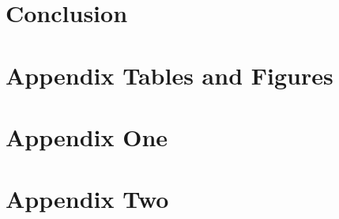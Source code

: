 \documentclass[12pt]{article}
\begin{document}
% 



% 


% 


\section{Conclusion\label{sec:conclusion}}


\clearpage
\begin{singlespace}

%
%

\end{singlespace}


\newpage
\appendix
\setcounter{table}{0}
\renewcommand{\tablename}{Appendix Table}
\renewcommand{\figurename}{Appendix Figure}
\renewcommand{\thetable}{A\arabic{table}}
\setcounter{figure}{0}
\renewcommand{\thefigure}{A\arabic{figure}}

\section{Appendix Tables and Figures}
% 

\newpage 
\section{Appendix One \label{sec:appendix:first}}
\renewcommand{\thetable}{B\arabic{table}}
\setcounter{table}{0}
\renewcommand{\thefigure}{B\arabic{figure}}
\setcounter{figure}{0}

% 

\newpage
\section{Appendix Two
\label{sec:appendix:two}}
\renewcommand{\thetable}{C\arabic{table}}
\setcounter{table}{0}
\renewcommand{\thefigure}{C\arabic{figure}}
\setcounter{figure}{0}
\end{document}
